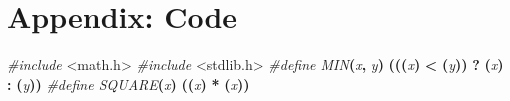 \documentclass[
  12pt,
]{article}
\newenvironment{Shaded}{\begin{snugshade}}{\end{snugshade}}
\newcommand{\ImportTok}[1]{#1}
\newcommand{\OperatorTok}[1]{\textcolor[rgb]{0.81,0.36,0.00}{\textbf{#1}}}
\newcommand{\PreprocessorTok}[1]{\textcolor[rgb]{0.56,0.35,0.01}{\textit{#1}}}
\begin{document}
\section{Appendix: Code}\label{appendix-code}

\begin{Shaded}
\begin{Highlighting}[]
\PreprocessorTok{\#include }\ImportTok{\textless{}math.h\textgreater{}}
\PreprocessorTok{\#include }\ImportTok{\textless{}stdlib.h\textgreater{}}
\PreprocessorTok{\#define MIN}\OperatorTok{(}\PreprocessorTok{x}\OperatorTok{,}\PreprocessorTok{ y}\OperatorTok{)}\PreprocessorTok{ }\OperatorTok{(((}\PreprocessorTok{x}\OperatorTok{)}\PreprocessorTok{ }\OperatorTok{\textless{}}\PreprocessorTok{ }\OperatorTok{(}\PreprocessorTok{y}\OperatorTok{))}\PreprocessorTok{ }\OperatorTok{?}\PreprocessorTok{ }\OperatorTok{(}\PreprocessorTok{x}\OperatorTok{)}\PreprocessorTok{ }\OperatorTok{:}\PreprocessorTok{ }\OperatorTok{(}\PreprocessorTok{y}\OperatorTok{))}
\PreprocessorTok{\#define SQUARE}\OperatorTok{(}\PreprocessorTok{x}\OperatorTok{)}\PreprocessorTok{ }\OperatorTok{((}\PreprocessorTok{x}\OperatorTok{)}\PreprocessorTok{ }\OperatorTok{*}\PreprocessorTok{ }\OperatorTok{(}\PreprocessorTok{x}\OperatorTok{))}


\end{Highlighting}
\end{Shaded}
\end{document}
